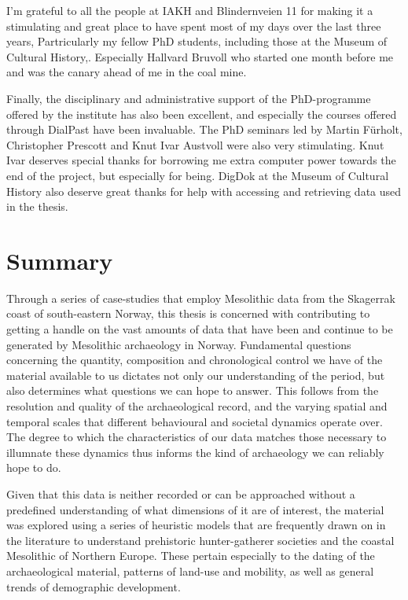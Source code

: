 I'm grateful to all the people at IAKH and Blindernveien 11 for making it a stimulating and great place to have spent most of my days over the last three years, Partricularly my fellow PhD students, including those at the Museum of Cultural History,. Especially Hallvard Bruvoll who started one month before me and was the canary ahead of me in the coal mine.

Finally, the disciplinary and administrative support of the PhD-programme offered by the institute has also been excellent, and especially the courses offered through DialPast have been invaluable. The PhD seminars led by Martin Fürholt, Christopher Prescott and Knut Ivar Austvoll were also very stimulating. Knut Ivar deserves special thanks for borrowing me extra computer power towards the end of the project, but especially for being.  DigDok at the Museum of Cultural History also deserve great thanks for help with accessing and retrieving data used in the thesis.


\section*{Summary}
Through a series of case-studies that employ Mesolithic data from the Skagerrak coast of south-eastern Norway, this thesis is concerned with contributing to getting a handle on the vast amounts of data that have been and continue to be generated by Mesolithic archaeology in Norway. Fundamental questions concerning the quantity, composition and chronological control we have of the material available to us dictates not only our understanding of the period, but also determines what questions we can hope to answer. This follows from the resolution and quality of the archaeological record, and the varying spatial and temporal scales that different behavioural and societal dynamics operate over. The degree to which the characteristics of our data matches those necessary to illumnate these dynamics thus informs the kind of archaeology we can reliably hope to do.   

Given that this data is neither recorded or can be approached without a predefined understanding of what dimensions of it are of interest, the material was explored using a series of heuristic models that are frequently drawn on in the literature to understand prehistoric hunter-gatherer societies and the coastal Mesolithic of Northern Europe. These pertain especially to the dating of the archaeological material, patterns of land-use and mobility, as well as general trends of demographic development. 

